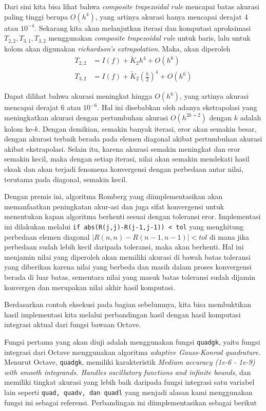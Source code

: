 \documentclass[journal,12pt,onecolumn,a4paper]{IEEEtran}
\begin{document}
Dari sini kita bisa lihat bahwa \emph{composite trapezoidal rule} mencapai batas akurasi paling tinggi berupa \(O(h^4)\), yang artinya akurasi hanya mencapai derajat 4 atau \(10^{-4}\).
Sekarang kita akan melanjutkan iterasi dan komputasi aproksimasi \(T_{2,2}, T_{3,1}, T_{3,2}\) menggunakan \emph{composite trapezoidal rule} untuk baris, lalu untuk kolom akan digunakan \emph{richardson's extrapolation}. Maka, akan diperoleh
\begin{equation*}
	\begin{split}
		T_{2,2} & = I(f) + \tilde{K}_2h^4 +O(h^6) \\
		T_{3,2} & = I(f) + \tilde{K}_2(\frac{h}{2})^4 + O(h^6)
	\end{split}
\end{equation*}

Dapat dilihat bahwa akurasi meningkat hingga \(O(h^6)\), yang artinya akurasi mencapai derajat 6 atau \(10^{-6}\). Hal ini disebabkan oleh adanya ekstrapolasi yang meningkatkan akurasi dengan pertumbuhan akurasi \(O(h^{2k+2})\) dengan \(k\) adalah kolom ke-\(k\). Dengan demikian, semakin banyak iterasi, eror akan semakin besar, dengan akurasi terbaik berada pada elemen diagonal akibat pertumbuhan akurasi akibat ekstrapolasi.
Selain itu, karena akurasi semakin meningkat dan eror semakin kecil, maka dengan setiap iterasi, nilai akan semakin mendekati hasil eksak dan akan terjadi fenomena konvergensi dengan perbedaan antar nilai, terutama pada diagonal, semakin kecil.

Dengan premis ini, algoritma Romberg yang diimplementasikan akan memanfaatkan peningkatan akur\hyp{}asi dan juga sifat konvergensi untuk menentukan kapan algoritma berhenti sesuai dengan toleransi eror. Implementasi ini dilakukan melalui \lstinline{if abs(R(j,j)-R(j-1,j-1)) < tol} yang menghitung perbedaan elemen diagonal \(|R(n,n)-R(n-1,n-1)| < tol\) di mana jika perbedaan sudah lebih kecil daripada toleransi, maka akan berhenti.
Hal ini menjamin nilai yang diperoleh akan memiliki akurasi di bawah batas toleransi yang diberikan karena nilai yang berbeda dan masih dalam proses konvergensi berada di luar batas, sementara nilai yang masuk batas toleransi sudah dijamin konvergen dan merupakan nilai akhir hasil komputasi.

Berdasarkan contoh eksekusi pada bagian sebelumnya, kita bisa membuktikan hasil implementasi kita melalui perbandingan hasil dengan hasil komputasi integrasi aktual dari fungsi bawaan Octave.

Fungsi pertama yang akan diuji adalah menggunakan fungsi \lstinline{quadgk}, yaitu fungsi integrasi dari Octave menggunakan algoritma \emph{adaptive Gauss-Konrod quadrature}. Menurut Octave, \lstinline{quadgk}, memiliki karakteristik \emph{Medium accuracy (1e-6 - 1e-9) with smooth integrands. Handles oscillatory functions and infinite bounds}, dan memiliki tingkat akurasi yang lebih baik daripada fungsi integrasi satu variabel lain seperti \lstinline{quad, quadv, dan quadl} yang menjadi alasan kami menggunakan fungsi ini sebagai referensi.
Perbandingan ini diimplementasikan sebagai berikut
\end{document}
